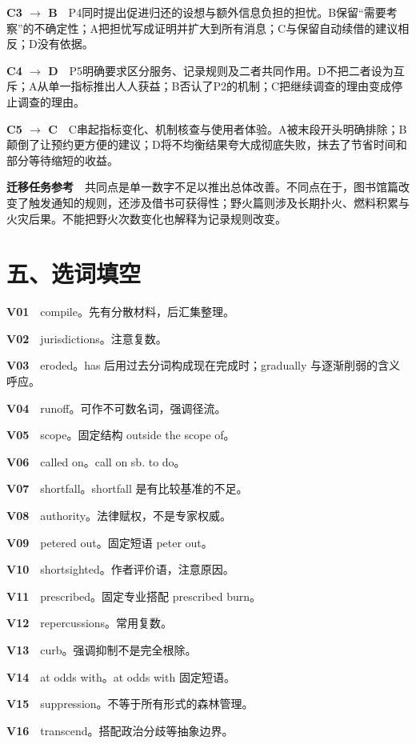 \documentclass[a4paper,11pt,openany]{report}
\begin{document}
\textbf{C3 \(\rightarrow\) B}　P4同时提出促进归还的设想与额外信息负担的担忧。B保留``需要考察''的不确定性；A把担忧写成证明并扩大到所有消息；C与保留自动续借的建议相反；D没有依据。

\textbf{C4 \(\rightarrow\) D}　P5明确要求区分服务、记录规则及二者共同作用。D不把二者设为互斥；A从单一指标推出人人获益；B否认了P2的机制；C把继续调查的理由变成停止调查的理由。

\textbf{C5 \(\rightarrow\) C}　C串起指标变化、机制核查与使用者体验。A被末段开头明确排除；B颠倒了让预约更方便的建议；D将不均衡结果夸大成彻底失败，抹去了节省时间和部分等待缩短的收益。

\textbf{迁移任务参考}　共同点是单一数字不足以推出总体改善。不同点在于，图书馆篇改变了触发通知的规则，还涉及借书可获得性；野火篇则涉及长期扑火、燃料积累与火灾后果。不能把野火次数变化也解释为记录规则改变。

\section{五、选词填空}\label{ux4e94ux9009ux8bcdux586bux7a7a}

\textbf{V01}　compile。先有分散材料，后汇集整理。

\textbf{V02}　jurisdictions。注意复数。

\textbf{V03}　eroded。has 后用过去分词构成现在完成时；gradually 与逐渐削弱的含义呼应。

\textbf{V04}　runoff。可作不可数名词，强调径流。

\textbf{V05}　scope。固定结构 outside the scope of。

\textbf{V06}　called on。call on sb. to do。

\textbf{V07}　shortfall。shortfall 是有比较基准的不足。

\textbf{V08}　authority。法律赋权，不是专家权威。

\textbf{V09}　petered out。固定短语 peter out。

\textbf{V10}　shortsighted。作者评价语，注意原因。

\textbf{V11}　prescribed。固定专业搭配 prescribed burn。

\textbf{V12}　repercussions。常用复数。

\textbf{V13}　curb。强调抑制不是完全根除。

\textbf{V14}　at odds with。at odds with 固定短语。

\textbf{V15}　suppression。不等于所有形式的森林管理。

\textbf{V16}　transcend。搭配政治分歧等抽象边界。
\end{document}
